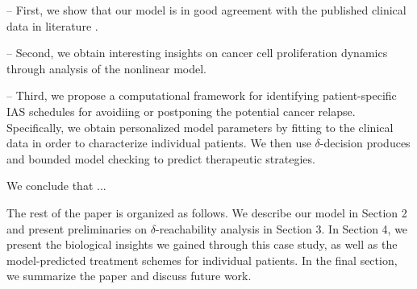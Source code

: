 -- First, we show that our model is in good agreement with the published clinical data in literature \cite{ bruchovsky06,bruchovsky07}. %

-- Second, we obtain interesting insights on cancer cell proliferation dynamics through analysis of the nonlinear model. %

-- Third, we propose a computational framework for identifying patient-specific IAS schedules for avoidiing or postponing the potential cancer relapse. Specifically, we obtain personalized model parameters by fitting to the clinical data in order to characterize individual patients. We then use $\delta$-decision produces and bounded model checking to predict therapeutic strategies. 

We conclude that ...


The rest of the paper is organized as follows. We describe our model in Section 2 and present preliminaries on $\delta$-reachability analysis in Section 3. In Section 4, we present the biological insights we gained through this case study, as well as the model-predicted treatment schemes for individual patients. In the final section, we summarize the paper and discuss future work.
